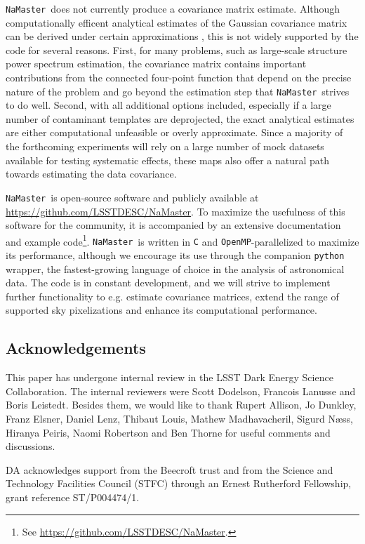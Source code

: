 \documentclass[usenatbib]{mnrasb}
\newcommand{\nmt}{{\tt NaMaster}}
\begin{document}
    \nmt~does not currently produce a covariance matrix estimate. Although computationally efficent analytical estimates of the Gaussian covariance matrix can be derived under certain approximations \citep{2004MNRAS.349..603E,2005MNRAS.360.1262B}, this is not widely supported by the code for several reasons. First, for many problems, such as large-scale structure power spectrum estimation, the covariance matrix contains important contributions from the connected four-point function that depend on the precise nature of the problem and go beyond the estimation step that \nmt~strives to do well. Second, with all additional options included, especially if a large number of contaminant templates are deprojected, the exact analytical estimates are either computational unfeasible or overly approximate. Since a majority of the forthcoming experiments will rely on a large number of mock datasets available for testing systematic effects, these maps also offer a natural path towards estimating the data covariance.
    
    \nmt~is open-source software and publicly available at \url{https://github.com/LSSTDESC/NaMaster}. To maximize the usefulness of this software for the community, it is accompanied by an extensive documentation and example code\footnote{See \url{https://github.com/LSSTDESC/NaMaster}.}. \nmt~is written in {\tt C} and {\tt OpenMP}-parallelized to maximize its performance, although we encourage its use through the companion {\tt python} wrapper, the fastest-growing language of choice in the analysis of astronomical data. The code is in constant development, and we will strive to implement further functionality to e.g. estimate covariance matrices, extend the range of supported sky pixelizations and enhance its computational performance.


\subsection*{Acknowledgements}
  This paper has undergone internal review in the LSST Dark Energy Science Collaboration. The internal reviewers were Scott Dodelson, Francois Lanusse and Boris Leistedt. Besides them, we would like to thank Rupert Allison, Jo Dunkley, Franz Elsner, Daniel Lenz, Thibaut Louis, Mathew Madhavacheril, Sigurd N\ae ss, Hiranya Peiris, Naomi Robertson and Ben Thorne for useful comments and discussions. 

  

  DA acknowledges support from the Beecroft trust and from the Science and Technology Facilities Council (STFC) through an Ernest Rutherford Fellowship, grant reference ST/P004474/1.
  
\end{document}

